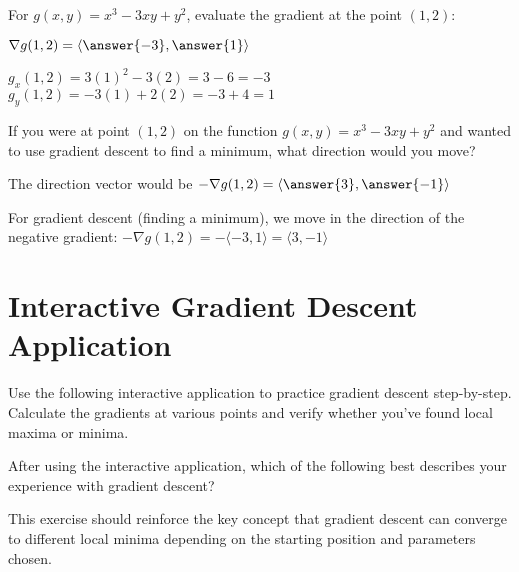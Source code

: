 \documentclass{ximera}
\begin{document}
\begin{exercise}
For $g(x,y) = x^3 - 3xy + y^2$, evaluate the gradient at the point $(1, 2)$:

$\nabla g(1, 2) = \langle \answer{-3}, \answer{1} \rangle$

\begin{feedback}
$g_x(1, 2) = 3(1)^2 - 3(2) = 3 - 6 = -3$
$g_y(1, 2) = -3(1) + 2(2) = -3 + 4 = 1$
\end{feedback}
\end{exercise}

\begin{exercise}
If you were at point $(1, 2)$ on the function $g(x,y) = x^3 - 3xy + y^2$ and wanted to use gradient descent to find a minimum, what direction would you move?

The direction vector would be $-\nabla g(1, 2) = \langle \answer{3}, \answer{-1} \rangle$

\begin{feedback}
For gradient descent (finding a minimum), we move in the direction of the negative gradient: $-\nabla g(1, 2) = -\langle -3, 1 \rangle = \langle 3, -1 \rangle$
\end{feedback}
\end{exercise}

\section{Interactive Gradient Descent Application}

Use the following interactive application to practice gradient descent step-by-step. Calculate the gradients at various points and verify whether you've found local maxima or minima.

\begin{center}
\end{center}

\begin{exercise}
After using the interactive application, which of the following best describes your experience with gradient descent?

\begin{multipleChoice}
\end{multipleChoice}

\begin{feedback}
This exercise should reinforce the key concept that gradient descent can converge to different local minima depending on the starting position and parameters chosen.
\end{feedback}
\end{exercise}
\end{document}
